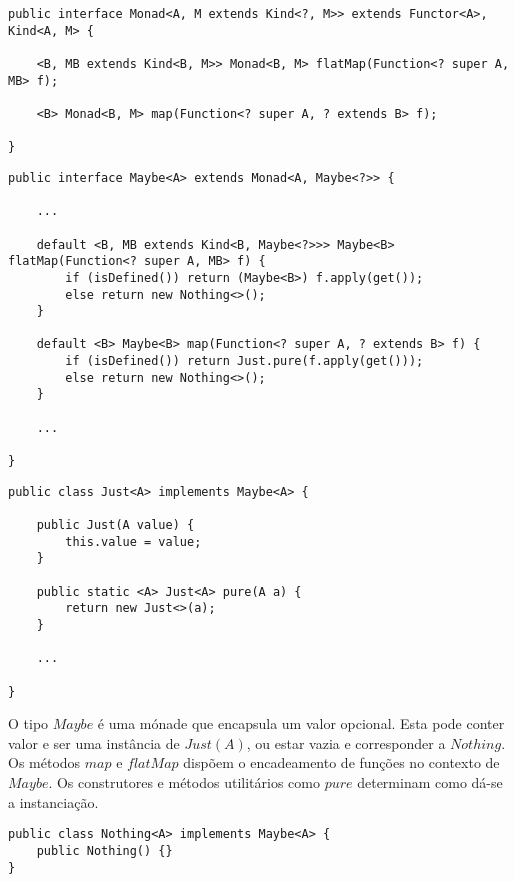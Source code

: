 \documentclass[10pt, conference]{IEEEtran}
\begin{document}
\begin{lstlisting}[float = *, caption = {Interface $Monad$}, label = {lst:monad-interface}]
public interface Monad<A, M extends Kind<?, M>> extends Functor<A>, Kind<A, M> {

	<B, MB extends Kind<B, M>> Monad<B, M> flatMap(Function<? super A, MB> f);

	<B> Monad<B, M> map(Function<? super A, ? extends B> f);

}
\end{lstlisting}

\begin{lstlisting}[float = *, caption = {Interface $Maybe$}, label = {lst:maybe-class}]
public interface Maybe<A> extends Monad<A, Maybe<?>> {

	...
	
	default <B, MB extends Kind<B, Maybe<?>>> Maybe<B> flatMap(Function<? super A, MB> f) {
		if (isDefined()) return (Maybe<B>) f.apply(get());
		else return new Nothing<>();
	}

	default <B> Maybe<B> map(Function<? super A, ? extends B> f) {
		if (isDefined()) return Just.pure(f.apply(get()));
		else return new Nothing<>();
	}
	
	...	
	
}
\end{lstlisting}

\begin{lstlisting}[caption = {Classe $Just$}, label = {lst:just-class}]
public class Just<A> implements Maybe<A> {

	public Just(A value) {
		this.value = value;
	}

	public static <A> Just<A> pure(A a) {
		return new Just<>(a);
	}
    
	...

}
\end{lstlisting}

O tipo $Maybe$ é uma mónade que encapsula um valor opcional. Esta pode conter valor e ser uma instância de $Just(A)$, ou estar vazia e corresponder a $Nothing$. Os métodos $map$ e $flatMap$ dispõem o encadeamento de funções no contexto de $Maybe$. Os construtores e métodos utilitários  como $pure$ determinam como dá-se a instanciação.

\begin{lstlisting}[caption = {Classe $Nothing$}, label = {lst:nothing-class}]
public class Nothing<A> implements Maybe<A> {
	public Nothing() {}
}
\end{lstlisting}
\end{document}
